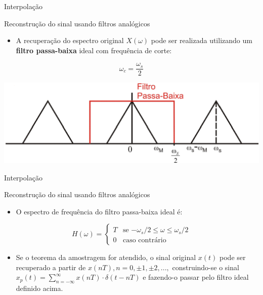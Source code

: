 \begin{frame}{Interpolação}
\begin{block}{Reconstrução do sinal usando filtros analógicos}
\begin{itemize}
    \item A recuperação do espectro original $X(\omega)$ pode ser realizada utilizando um \textbf{filtro passa-baixa} ideal com frequência de corte:
\end{itemize}
$$\boxed{\omega_c = \dfrac{\omega_s}{2}}$$
\end{block}
\vspace{0.5cm}
\centerline{\includegraphics[width=0.9\linewidth]{Figuras/Ch02/fig15.PNG}}
\end{frame}

\begin{frame}{Interpolação}
\begin{block}{Reconstrução do sinal usando filtros analógicos}
\begin{itemize}
    \item O espectro de frequência do filtro passa-baixa ideal é:
\end{itemize}
\begin{equation*}
H(\omega) = \begin{cases}
T &\text{se $-\omega_s/2 \leq \omega \leq \omega_s/2$} \\
0 &\text{caso contrário}
\end{cases}
\end{equation*}
\begin{itemize}
    \item Se o teorema da amostragem for atendido, o sinal original  $x(t)$ pode ser recuperado a partir de $x(nT), n = 0, \pm 1, \pm 2, ...,$ construindo-se o sinal $x_p(t) = \sum_{n=-\infty}^{\infty}x(nT) \cdot \delta(t-nT)$ e fazendo-o passar  pelo filtro ideal definido acima.
\end{itemize}
\end{block}
\end{frame}

